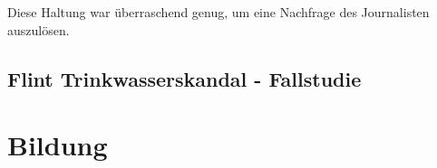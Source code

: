 Diese Haltung war überraschend genug, um eine Nachfrage des Journalisten
auszulösen.

\subsection{Flint Trinkwasserskandal - Fallstudie}

\section{Bildung}

